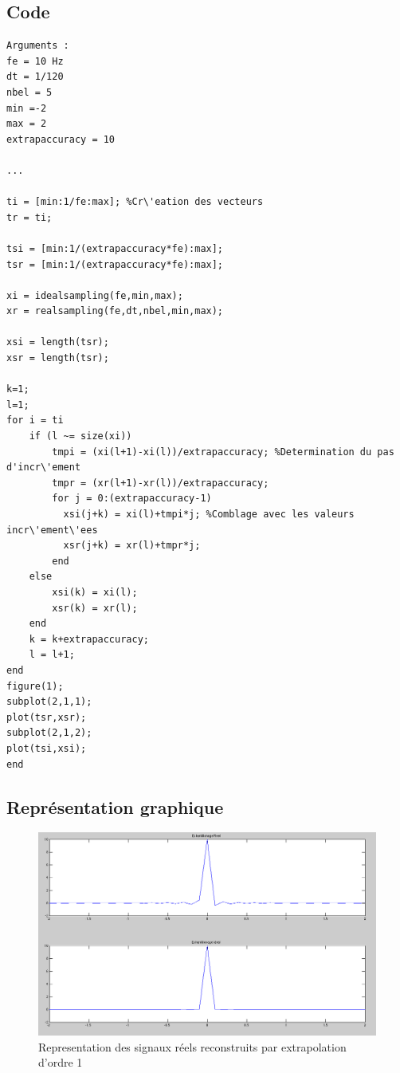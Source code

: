\documentclass[a4paper, oneside]{report}
\begin{document}
	\subsection{Code}
	 \begin{lstlisting}
Arguments :
fe = 10 Hz
dt = 1/120
nbel = 5
min =-2
max = 2
extrapaccuracy = 10

...
	 
ti = [min:1/fe:max]; %Cr\'eation des vecteurs
tr = ti;

tsi = [min:1/(extrapaccuracy*fe):max];
tsr = [min:1/(extrapaccuracy*fe):max];

xi = idealsampling(fe,min,max);
xr = realsampling(fe,dt,nbel,min,max);

xsi = length(tsr);
xsr = length(tsr);

k=1;
l=1;
for i = ti
    if (l ~= size(xi))
        tmpi = (xi(l+1)-xi(l))/extrapaccuracy; %Determination du pas d'incr\'ement
        tmpr = (xr(l+1)-xr(l))/extrapaccuracy;
        for j = 0:(extrapaccuracy-1)
          xsi(j+k) = xi(l)+tmpi*j; %Comblage avec les valeurs incr\'ement\'ees
          xsr(j+k) = xr(l)+tmpr*j;
        end
    else
        xsi(k) = xi(l);
        xsr(k) = xr(l);
    end
    k = k+extrapaccuracy;
    l = l+1;
end
figure(1);
subplot(2,1,1);
plot(tsr,xsr);
subplot(2,1,2);
plot(tsi,xsi);
end
\end{lstlisting} 

\newpage{}
\subsection{Repr\'esentation graphique}
	
	\begin{figure}[h]
   \centering
    \includegraphics[scale=0.43]{images/Exo4_1.png}
    \caption{Representation des signaux r\'eels reconstruits par extrapolation d'ordre 1}
  \end{figure}
\end{document}
